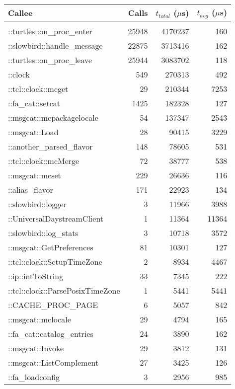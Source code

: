 \documentclass{article}[letter,10pt]
\begin{document}
{{{        {\footnotesize
        \begin{longtable}{l r r r}
          \toprule
          Callee & Calls & $t_{total}$ ($\mu$s) & $t_{avg}$ ($\mu$s) \\
          \midrule \\
          \endhead
          ::turtles::on\_proc\_enter & 25948 & 4170237 & 160 \\
          ::slowbird::handle\_message & 22875 & 3713416 & 162 \\
          ::turtles::on\_proc\_leave & 25944 & 3083702 & 118 \\
          ::clock & 549 & 270313 & 492 \\
          ::tcl::clock::mcget & 29 & 210344 & 7253 \\
          ::fa\_cat::setcat & 1425 & 182328 & 127 \\
          ::msgcat::mcpackagelocale & 54 & 137347 & 2543 \\
          ::msgcat::Load & 28 & 90415 & 3229 \\
          ::another\_parsed\_flavor & 148 & 78605 & 531 \\
          ::tcl::clock::mcMerge & 72 & 38777 & 538 \\
          ::msgcat::mcset & 229 & 26636 & 116 \\
          ::alias\_flavor & 171 & 22923 & 134 \\
          ::slowbird::logger & 3 & 11966 & 3988 \\
          ::UniversalDaystreamClient & 1 & 11364 & 11364 \\
          ::slowbird::log\_stats & 3 & 10718 & 3572 \\
          ::msgcat::GetPreferences & 81 & 10301 & 127 \\
          ::tcl::clock::SetupTimeZone & 2 & 8934 & 4467 \\
          ::ip::intToString & 33 & 7345 & 222 \\
          ::tcl::clock::ParsePosixTimeZone & 1 & 5441 & 5441 \\
          ::CACHE\_PROC\_PAGE & 6 & 5057 & 842 \\
          ::msgcat::mclocale & 29 & 4794 & 165 \\
          ::fa\_cat::catalog\_entries & 24 & 3890 & 162 \\
          ::msgcat::Invoke & 29 & 3812 & 131 \\
          ::msgcat::ListComplement & 27 & 3425 & 126 \\
          ::fa\_loadconfig & 3 & 2956 & 985 \\

\end{longtable}}}}}
\end{document}
